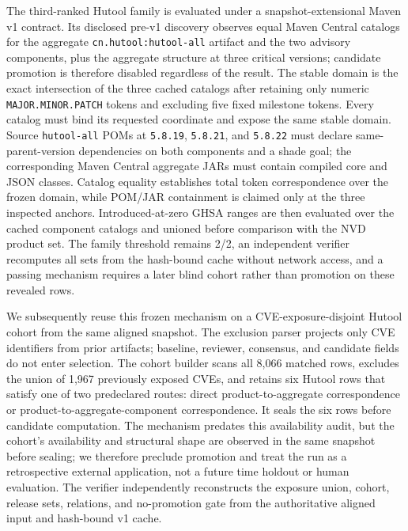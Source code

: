 The third-ranked Hutool family is evaluated under a snapshot-extensional Maven v1 contract. Its disclosed pre-v1 discovery observes equal Maven Central catalogs for the aggregate \texttt{cn.hutool:hutool-all} artifact and the two advisory components, plus the aggregate structure at three critical versions; candidate promotion is therefore disabled regardless of the result. The stable domain is the exact intersection of the three cached catalogs after retaining only numeric \texttt{MAJOR.MINOR.PATCH} tokens and excluding five fixed milestone tokens. Every catalog must bind its requested coordinate and expose the same stable domain. Source \texttt{hutool-all} POMs at \texttt{5.8.19}, \texttt{5.8.21}, and \texttt{5.8.22} must declare same-parent-version dependencies on both components and a shade goal; the corresponding Maven Central aggregate JARs must contain compiled core and JSON classes. Catalog equality establishes total token correspondence over the frozen domain, while POM/JAR containment is claimed only at the three inspected anchors. Introduced-at-zero GHSA ranges are then evaluated over the cached component catalogs and unioned before comparison with the NVD product set. The family threshold remains 2/2, an independent verifier recomputes all sets from the hash-bound cache without network access, and a passing mechanism requires a later blind cohort rather than promotion on these revealed rows.

We subsequently reuse this frozen mechanism on a CVE-exposure-disjoint Hutool cohort from the same aligned snapshot. The exclusion parser projects only CVE identifiers from prior artifacts; baseline, reviewer, consensus, and candidate fields do not enter selection. The cohort builder scans all 8,066 matched rows, excludes the union of 1,967 previously exposed CVEs, and retains six Hutool rows that satisfy one of two predeclared routes: direct product-to-aggregate correspondence or product-to-aggregate-component correspondence. It seals the six rows before candidate computation. The mechanism predates this availability audit, but the cohort's availability and structural shape are observed in the same snapshot before sealing; we therefore preclude promotion and treat the run as a retrospective external application, not a future time holdout or human evaluation. The verifier independently reconstructs the exposure union, cohort, release sets, relations, and no-promotion gate from the authoritative aligned input and hash-bound v1 cache.

